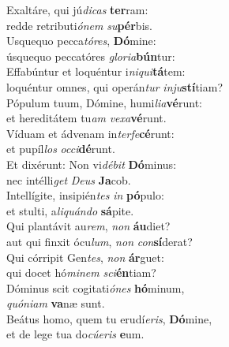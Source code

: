 \evenverse Exaltáre, qui jú\textit{di}\textit{cas} \textbf{ter}ram:~\*\\
\evenverse redde retributi\textit{ó}\textit{nem} \textit{su}\textbf{pér}bis.\\
\oddverse Usquequo pecca\textit{tó}\textit{res}, \textbf{Dó}mine:~\*\\
\oddverse úsquequo peccatóres \textit{glo}\textit{ri}\textit{a}\textbf{bún}tur:\\
\evenverse Effabúntur et loquéntur i\textit{ni}\textit{qui}\textbf{tá}tem:~\*\\
\evenverse loquéntur omnes, qui operán\textit{tur} \textit{in}\textit{ju}\textbf{stí}tiam?\\
\oddverse Pópulum tuum, Dómine, humi\textit{li}\textit{a}\textbf{vé}runt:~\*\\
\oddverse et hereditátem tu\textit{am} \textit{ve}\textit{xa}\textbf{vé}runt.\\
\evenverse Víduam et ádvenam in\textit{ter}\textit{fe}\textbf{cé}runt:~\*\\
\evenverse et pupíl\textit{los} \textit{oc}\textit{ci}\textbf{dé}runt.\\
\oddverse Et dixérunt: Non vi\textit{dé}\textit{bit} \textbf{Dó}minus:~\*\\
\oddverse nec intélli\textit{get} \textit{De}\textit{us} \textbf{Ja}cob.\\
\evenverse Intellígite, insipién\textit{tes} \textit{in} \textbf{pó}pulo:~\*\\
\evenverse et stulti, a\textit{li}\textit{quán}\textit{do} \textbf{sá}pite.\\
\oddverse Qui plantávit au\textit{rem}, \textit{non} \textbf{áu}diet?~\*\\
\oddverse aut qui finxit ócu\textit{lum}, \textit{non} \textit{con}\textbf{sí}derat?\\
\evenverse Qui córripit Gen\textit{tes}, \textit{non} \textbf{ár}guet:~\*\\
\evenverse qui docet hó\textit{mi}\textit{nem} \textit{sci}\textbf{én}tiam?\\
\oddverse Dóminus scit cogitati\textit{ó}\textit{nes} \textbf{hó}minum,~\*\\
\oddverse \textit{quó}\textit{ni}\textit{am} \textbf{va}næ sunt.\\
\evenverse Beátus homo, quem tu erudí\textit{e}\textit{ris}, \textbf{Dó}mine,~\*\\
\evenverse et de lege tua do\textit{cú}\textit{e}\textit{ris} \textbf{e}um.\\
